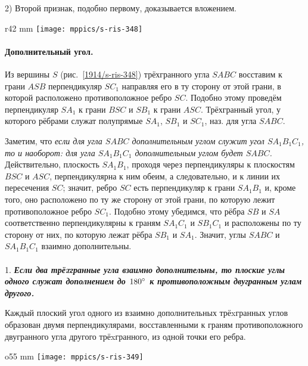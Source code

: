 2) Второй признак, подобно первому, доказывается вложением.

\begin{wrapfigure}{r}{42 mm}
\vskip0mm
\centering
\texttt{[image: mppics/s-ris-348]}
\caption{}\label{1914/s-ris-348}
\end{wrapfigure}

\paragraph{Дополнительный угол.}\label{1914/399}
Из вершины $S$ (рис.~\ref{1914/s-ris-348}) трёхгранного угла $SABC$ восставим к грани $ASB$ перпендикуляр $SC_1$ направляя его в ту сторону от этой грани, в которой расположено противоположное ребро $SC$.
Подобно этому проведём перпендикуляр $SA_1$ к грани $BSC$ и $SB_1$ к грани $ASC$. Трёхгранный угол, у которого рёбрами служат полупрямые $SA_1$, $SB_1$ и $SC_1$, наз.  для угла $SABC$.

Заметим, что \emph{если для угла $SABC$ дополнительным углом служит угол $SA_1B_1C_1$, то и наоборот: для угла $SA_1B_1C_1$ дополнительным углом будет $SABC$.}
Действительно, плоскость $SA_1B_1$, проходя через перпендикуляры к плоскостям $BSC$ и $ASC$, перпендикулярна к ним обеим, а следовательно, и к линии их пересечения $SC$; значит, ребро $SC$ есть перпендикуляр к грани $SA_1B_1$ и, кроме того, оно расположено по ту же сторону от этой грани, по которую лежит противоположное ребро $SC_1$.
Подобно этому убедимся, что рёбра $SB$ и $SA$ соответственно перпендикулярны к граням $SA_1C_1$ и $SB_1C_1$ и расположены по ту сторону от них, по которую лежат рёбра $SB_1$ и $SA_1$.
Значит, углы $SABC$ и $SA_1B_1C_1$ взаимно дополнительны.

\paragraph{}\label{1914/400}
 1.
\textbf{\emph{Если два трёxгранные угла взаимно дополнительны, то плоские углы одного служат дополнением до $180\degree$ к противоположным двугранным углам другого.}}

Каждый плоский угол одного из взаимно дополнительных трёxгранных углов образован двумя перпендикулярами, восставленными к граням противоположного двугранного угла другого трёxгранного, из одной точки его ребра.

\begin{wrapfigure}{o}{55 mm}
\vskip-4mm
\centering
\texttt{[image: mppics/s-ris-349]}
\caption{}\label{1914/s-ris-349}
\end{wrapfigure}

